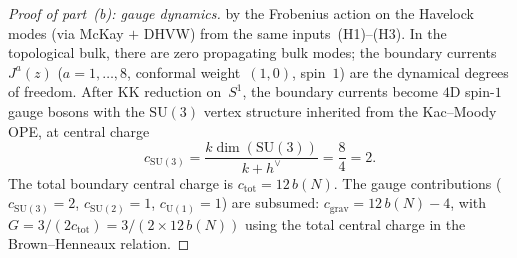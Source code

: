 \begin{proof}[Proof of part~(b): gauge dynamics]
by the Frobenius action on the Havelock modes
(via McKay $+$ DHVW) from the same inputs~(H1)--(H3).
In the topological bulk, there are zero propagating
bulk modes; the boundary currents $J^a(z)$
($a = 1, \ldots, 8$, conformal weight~$(1,0)$, spin~$1$)
are the dynamical degrees of freedom.
After KK reduction on~$S^1$, the boundary currents become
$4$D spin-$1$ gauge bosons with the $\mathrm{SU}(3)$ vertex
structure inherited from the Kac--Moody OPE,
at central charge
\begin{equation}\label{eq:csu3}
  c_{\mathrm{SU}(3)}
  = \frac{k\dim(\mathrm{SU}(3))}{k{+}h^\vee} = \frac{8}{4} = 2.
\end{equation}
The total boundary central charge is
$c_{\mathrm{tot}} = 12\,b(N)$.
The gauge contributions ($c_{\mathrm{SU}(3)} = 2$,
$c_{\mathrm{SU}(2)} = 1$, $c_{\mathrm{U}(1)} = 1$) are subsumed:
$c_{\mathrm{grav}} = 12\,b(N) - 4$, with
$G = 3/(2c_{\mathrm{tot}}) = 3/(2 \times 12\,b(N))$
using the total central charge in the Brown--Henneaux relation.
\end{proof}


